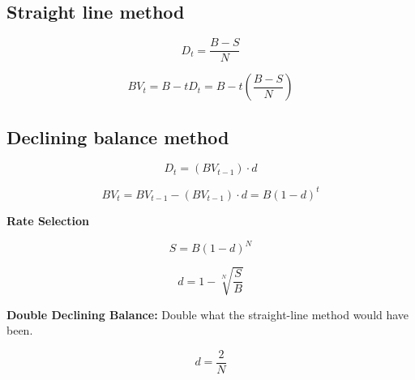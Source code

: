 \subsection{Straight line method}
\begin{definition}
    \begin{equation}
        D_t = \frac{B - S}{N}
    \end{equation}

    \begin{equation}
        BV_t = B - tD_t = B - t\left(\frac{B - S}{N}\right)
    \end{equation}
\end{definition}

\subsection{Declining balance method}
\begin{definition}
    \begin{equation}
        D_t = (BV_{t-1}) \cdot d            
    \end{equation}

    \begin{equation}
        BV_t = BV_{t-1} - (BV_{t-1}) \cdot d = B(1 - d)^t
    \end{equation}

    \textbf{Rate Selection}

    \begin{equation}
        S = B(1 - d)^N
    \end{equation}

    \begin{equation}
        d = 1 - \sqrt[N]{\frac{S}{B}}
    \end{equation}

    \textbf{Double Declining Balance:}
    Double what the straight-line method would have been.

    \begin{equation}
        d = \frac{2}{N}
    \end{equation}
\end{definition}

